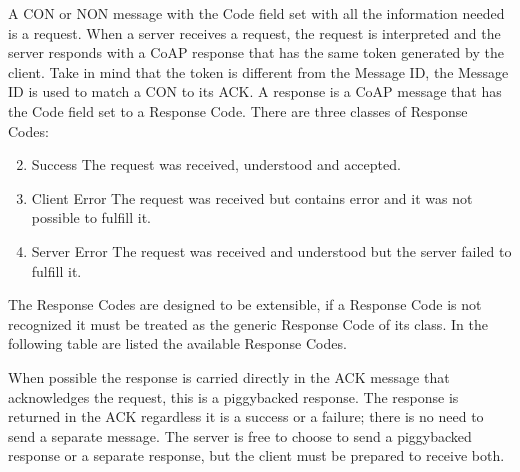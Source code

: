 	A CON or NON message with the Code field set with all the information needed is a request.\newline
	When a server receives a request, the request is interpreted and the server responds with a CoAP response that has the same token generated by the client.\newline
	Take in mind that the token is different from the Message ID, the Message ID is used to match a CON to its ACK.\newline
	A response is a CoAP message that has the Code field set to a Response Code.\newline
	There are three classes of Response Codes:\newline
	\begin{enumerate}
		\setcounter{enumi}{1}
		
		\item Success
		The request was received, understood and accepted.
		
		\setcounter{enumi}{3}
		
		\item Client Error
		The request was received but contains error and it was not possible to fulfill it.
		
		\item Server Error
		The request was received and understood but the server failed to fulfill it.
		
	\end{enumerate}
	
	The Response Codes are designed to be extensible, if a Response Code is not recognized it must be treated as the generic Response Code of its class.\newline
	In the following table are listed the available Response Codes.\newline
	
	
	

	When possible the response is carried directly in the ACK message that acknowledges the request, this is a piggybacked response.\newline
	The response is returned in the ACK regardless it is a success or a failure; there is no need to send a separate message.\newline
	The server is free to choose to send a piggybacked response or a separate response, but the client must be prepared to receive both.\newline
	

